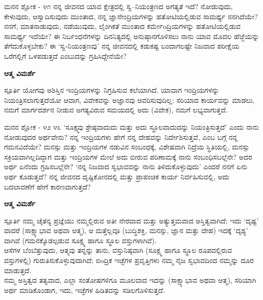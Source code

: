 \newpage
\begin{mananam}{\mananamfont \large ಮನನ ಶ್ಲೋಕ - ೪೧}
\mananamtext ನನ್ನ ಜೀವನದ ಯಾವ ಕ್ಷೇತ್ರದಲ್ಲಿ ಸ್ವ–ನಿಯಂತ್ರಣದ ಅಗತ್ಯತೆ ಇದೆ? ನೋಡುವುದು, ಕೇಳುವುದು, ಆಸ್ವಾದಿಸುವುದು ಮುಂತಾದ, ನನ್ನ ಜ್ಞಾನೇಂದ್ರಿಯಗಳನ್ನು ಹತೋಟಿಯಲ್ಲಿಡುವ ಸಾಮರ್ಥ್ಯ ನನಗಿದೆಯೇ? ನನಗೆ,  ಮಾತನಾಡುವುದು, ನಡೆಯುವುದು, ಲೈಂಗಿಕತೆ ಮುಂತಾದ ಕರ್ಮೇoದ್ರಿಯಗಳನ್ನು  ಹತೋಟಿಯಲ್ಲಿಡುವ ಸಾಮರ್ಥ್ಯ ಇದೆಯೇ? ಈ ನಿರ್ಬಂಧನೆಗಳನ್ನು ದಿನನಿತ್ಯದಲ್ಲಿ ಅನುಷ್ಠಾನಗೊಳಿಸಲು ನಾನು ಯಾವ ಮೊದಲ ಹೆಜ್ಜೆಯನ್ನು ತೆಗೆದುಕೊಳ್ಳಬೇಕು? ಈ ‘ಸ್ವ-ನಿಯಂತ್ರಣವು’ ನನ್ನ ಜೀವನದಲ್ಲಿ ಕಡುಕಷ್ಟ ಬಂದಾಗಲಷ್ಟೇ ನಿಜವಾದ ಪರೀಕ್ಷೆಯ ಒರೆಗಲ್ಲಿಗೆ ಒಳಪಡುತ್ತದೆ ಎಂಬುದನ್ನು ಗ್ರಹಿಸಿದ್ದೇನೆಯೇ? 
\end{mananam}
\WritingHand\enspace\textbf{ಆತ್ಮ ವಿಮರ್ಶೆ}\\
\begin{inspiration}{\mananamfont \large ಸ್ಪೂರ್ತಿ}
\mananamtext ಯೋಗವು ಅಶಿಸ್ತಿನ ಇಂದ್ರಿಯಗಳನ್ನು ನಿಗ್ರಹಿಸುವ ಕಲೆಯಾಗಿದೆ. ಯಾವಾಗ ಇಂದ್ರಿಯಗಳನ್ನು ನಿಯಂತ್ರಿಸಲಾಗುತ್ತದೆಯೋ ಆವಾಗ, ವಿವೇಕವನ್ನು ಅಜ್ಞಾನವು ಆವರಿಸುವುದಿಲ್ಲ; ಸರಿಯಾದ ಕಾರ್ಯವನ್ನು ಮಾಡಲು, ನಮಗೆ ಮಾರ್ಗದರ್ಶನ ನೀಡುವ ಅಗತ್ಯವಿರುವ ಸಮಯದಲ್ಲಿ ಅದು (ವಿವೇಕ), ನಮಗೆ ಲಭ್ಯವಾಗುತ್ತದೆ.
\end{inspiration}

\newpage
\begin{mananam}{\mananamfont \large ಮನನ ಶ್ಲೋಕ - ೪೨ ೪೩}
\mananamtext ‘ಸೂಕ್ಷ್ಮವು ಶ್ರೇಷ್ಠವಾದುದು ಮತ್ತು ಅದು ಸ್ಥೂಲವಾದುದನ್ನು ನಿಯಂತ್ರಿಸುತ್ತದೆ’ ಎಂದು ನಾನು ನೋಡುವುದರ  ಅರ್ಥವೇನು?
ನನ್ನ ಇಂದ್ರಿಯಗಳು ಹೇಗೆ ನನ್ನ ದೇಹವನ್ನು ನಿರ್ದೇಶಿಸುತ್ತವೆ, ಎಂಬ ಬಗ್ಗೆ ನನ್ನ ಗಮನವಿದೆಯೇ? ಮನಸ್ಸು ಮತ್ತು ಇಂದ್ರಿಯಗಳ ನಡುವಿನ ಸಂಬಂಧಕ್ಕೆ, ವಿಶೇಷವಾಗಿ ನಿದ್ರೆಯ ಸ್ಥಿತಿಯಲ್ಲಿ, ಮನಸ್ಸು ಸಕ್ರಿಯವಾಗಿಲ್ಲದಿದ್ದಾಗ ಮತ್ತು ಇಂದ್ರಿಯಗಳ ಮೇಲೆ ಅದು ಬೀರುವ ಪರಿಣಾಮಕ್ಕೆ  ನಾನು ಸಂಬಂಧಿಸಬಲ್ಲೆನೇ? ಅದರ ಅರ್ಥ ಏನೆಂದು ಗ್ರಹಿಸಬಲ್ಲೆನೇ? ‘ನನ್ನ ನಿಜವಾದ ಸ್ವಭಾವವನ್ನು ನಾನು ತಿಳಿದುಕೊಳ್ಳುವುದು’ ಎಂದರೆ ನನಗೆ ಏನು ಅರ್ಥ ಕೊಡುತ್ತದೆ? ನನ್ನ ಜೀವನದ ದೃಷ್ಟಿಕೋನದಲ್ಲಿ ಮತ್ತು ಪ್ರಾಪಂಚಿಕ ಕಾರ್ಯ ನಿರ್ವಹಿಸುವಲ್ಲಿ, ಅದು ಬದಲಾವಣೆಗೆ ಹೇಗೆ ಕಾರಣವಾಗುತ್ತದೆ?
\end{mananam}
\WritingHand\enspace\textbf{ಆತ್ಮ ವಿಮರ್ಶೆ}\\
\begin{inspiration}{\mananamfont \large ಸ್ಪೂರ್ತಿ}
\ssmall \mananamtext ನಮ್ಮ ಚೈತನ್ಯ ಪ್ರಜ್ಞೆಯು ನಮ್ಮಲ್ಲಿರುವ ಅತೀ ನೇರವಾದ ಮತ್ತು ಅತ್ಯುತ್ತಮವಾದ ಅಸ್ತಿತ್ವವಾಗಿದೆ; ಇದು ‘ದೃಷ್ಟ’ ವಾದರೆ (ಸಾಕ್ಷ್ಯಾಭಾವ ಅಥವಾ ಆತ್ಮ), ಆ ಮತ್ತೆಲ್ಲವೂ (ಬುದ್ಧಿಶಕ್ತಿ, ಮನಸ್ಸು, ಜ್ಞಾನ ಮತ್ತು ದೇಹ) ಇದಕ್ಕೆ ‘ದೃಶ್ಯ’ ವಾಗಿವೆ (ಗಮನಕ್ಕೊಡಲ್ಪಡುವ ಸೂಕ್ಷ್ಮ ಹಾಗೂ ಸ್ಥೂಲ  ವಸ್ತುಗಳಾಗಿವೆ).\\
ಆಸೆಗಳ ಬೆಂಬೆತ್ತುವುದು, ಆತ್ಮವು ತನ್ನನ್ನು ತಾನು, ವಸ್ತುನಿಷ್ಠವಾಗಿ (ಸೂಕ್ಷ್ಮ ಹಾಗೂ ಸ್ಥೂಲ ರೂಪದಲ್ಲಿರುವ  ವಸ್ತುಗಳಲ್ಲಿ) ಗುರುತಿಸುಕೊಳ್ಳುವುದಾಗಿದೆ; ಐoದ್ರಿಕ ಇಚ್ಛೆಗಳ ಪ್ರವೃತ್ತಿಗಳು ನಮ್ಮ ನೈಜ ಸ್ವಭಾವದಿಂದ ನಮ್ಮನ್ನು ದೂರ ಮಾಡುತ್ತದೆ.\\
ನಮ್ಮ ಅಸ್ತಿತ್ವದ ತತ್ವವಾದ, ಎಲ್ಲಾ ಸಂತೋಷಗಳಿಗೂ ಮೂಲವಾದ ಇದನ್ನು (ಸಾಕ್ಷ್ಯಾಭಾವ ಅಥವಾ ಆತ್ಮ), ಸರಿಯಾಗಿ ಅರ್ಥ ಮಾಡಿಕೊಂಡಾಗ, ಇದು, ಇಚ್ಛೆಗಳ ಹಿಡಿತವನ್ನು ಸಡಿಲಗೊಳಿಸುತ್ತದೆ.
\end{inspiration}
\newpage


